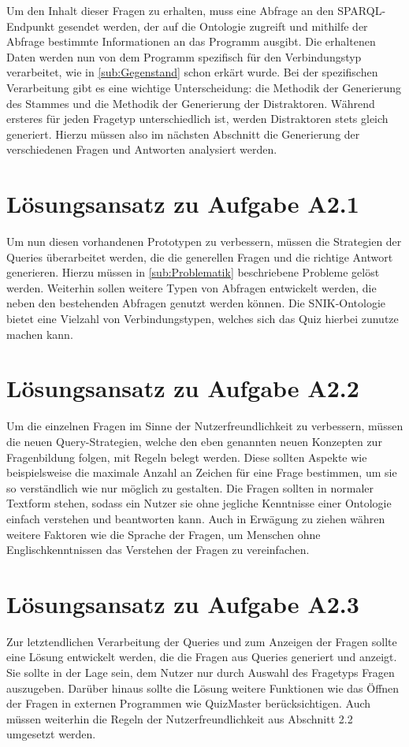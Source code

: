 \documentclass[headsepline,titlepage,ngerman,twoside,12pt]{report}
\begin{document}
Um den Inhalt dieser Fragen zu erhalten, muss eine Abfrage an den SPARQL-Endpunkt gesendet werden, der auf die Ontologie zugreift und mithilfe der Abfrage bestimmte Informationen an das Programm ausgibt.
Die erhaltenen Daten werden nun von dem Programm spezifisch für den Verbindungstyp verarbeitet, wie in \cref{sub:Gegenstand} schon erkärt wurde. Bei der spezifischen Verarbeitung gibt es eine wichtige Unterscheidung: die Methodik der Generierung des Stammes und die Methodik der Generierung der Distraktoren. Während ersteres für jeden Fragetyp unterschiedlich ist, werden Distraktoren stets gleich generiert. Hierzu müssen also im nächsten Abschnitt die Generierung der verschiedenen Fragen und Antworten analysiert werden.

\section{Lösungsansatz zu Aufgabe A2.1}
Um nun diesen vorhandenen Prototypen zu verbessern, müssen  die Strategien der Queries überarbeitet werden, die die generellen Fragen und die richtige Antwort generieren.
Hierzu müssen in \cref{sub:Problematik} beschriebene Probleme gelöst werden.
Weiterhin sollen weitere Typen von Abfragen entwickelt werden, die neben den bestehenden Abfragen genutzt werden können.
Die SNIK-Ontologie bietet eine Vielzahl von Verbindungstypen, welches sich das Quiz hierbei zunutze machen kann.

\section{Lösungsansatz zu Aufgabe A2.2}
Um die einzelnen Fragen im Sinne der Nutzerfreundlichkeit zu verbessern, müssen die neuen Query-Strategien, welche den eben genannten neuen Konzepten zur Fragenbildung folgen, mit Regeln belegt werden.
Diese sollten Aspekte wie beispielsweise die maximale Anzahl an Zeichen für eine Frage bestimmen, um sie so verständlich wie nur möglich zu gestalten.
Die Fragen sollten in normaler Textform stehen, sodass ein Nutzer sie ohne jegliche Kenntnisse einer Ontologie einfach verstehen und beantworten kann.
Auch in Erwägung zu ziehen währen weitere Faktoren wie die Sprache der Fragen, um Menschen ohne Englischkenntnissen das Verstehen der Fragen zu vereinfachen.

\section{Lösungsansatz zu Aufgabe A2.3}
Zur letztendlichen Verarbeitung der Queries und zum Anzeigen der Fragen sollte eine Lösung entwickelt werden, die die Fragen aus Queries generiert und anzeigt.
Sie sollte in der Lage sein, dem Nutzer nur durch Auswahl des Fragetyps Fragen auszugeben.
Darüber hinaus sollte die Lösung weitere Funktionen wie das Öffnen der Fragen in externen Programmen wie QuizMaster berücksichtigen.
Auch müssen weiterhin die Regeln der Nutzerfreundlichkeit aus Abschnitt 2.2 umgesetzt werden.
\end{document}

